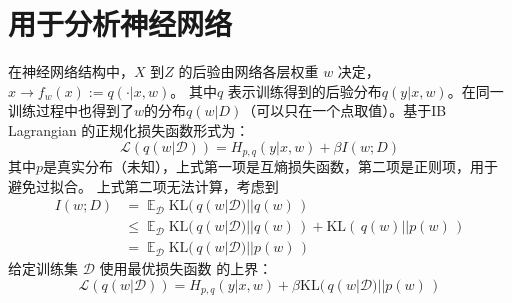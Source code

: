 \documentclass{article}
\DeclareMathOperator\E{\mathbb{E}}
\theoremstyle{definition}
\begin{document}
\section{用于分析神经网络}
在神经网络结构中，$X$ 到$Z$ 的后验由网络各层权重 $w$ 决定，$x \to f_w(x):= q(\cdot | x, w)$。 其中$q$ 表示训练得到的后验分布$q(y|x,w)$。在同一训练过程中也得到了$w$的分布$q(w|D)$（可以只在一个点取值）。基于IB Lagrangian 的正规化损失函数形式为：
\begin{equation}
\mathcal{L}( q(w | \mathcal{D}) )  = H_{ p, q}(y|x,w) + \beta I(w;D)
\end{equation}
其中$p$是真实分布（未知），上式第一项是互熵损失函数，第二项是正则项，用于避免过拟合。
上式第二项无法计算，考虑到 
\begin{align*}
I(w; D) & = \E_{\mathcal{D}} \mathrm{KL}(\,q(w| \mathcal{D}) || q(w)\,) \\
& \leq \E_{\mathcal{D}} \mathrm{KL}(\,q(w| \mathcal{D}) || q(w)\,) + \mathrm{KL}(\, q(w) || p(w) \,) \\
& = \E_{\mathcal{D}} \mathrm{KL}(\, q(w| \mathcal{D}) || p(w)\, )
\end{align*}
给定训练集 $\mathcal{D}$ 使用最优损失函数
的上界：
\begin{equation}
\mathcal{L}( q(w | \mathcal{D}) )  = H_{ p, q}(y|x,w) + \beta \mathrm{KL}(\, q(w| \mathcal{D}) || p(w)\, )
\end{equation}
\end{document}
